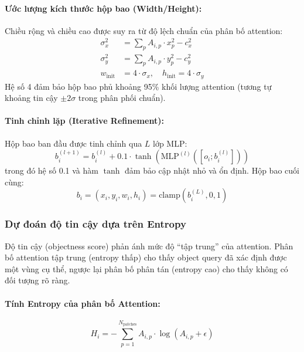 \paragraph{Ước lượng kích thước hộp bao (Width/Height):}
Chiều rộng và chiều cao được suy ra từ độ lệch chuẩn của phân bố attention:
\begin{align}
    \sigma_x^2 &= \sum_{p} A_{i,p} \cdot x_p^2 - c_x^2 \\
    \sigma_y^2 &= \sum_{p} A_{i,p} \cdot y_p^2 - c_y^2 \\
    w_{\text{init}} &= 4 \cdot \sigma_x, \quad h_{\text{init}} = 4 \cdot \sigma_y
\end{align}
Hệ số 4 đảm bảo hộp bao phủ khoảng 95\% khối lượng attention (tương tự khoảng tin cậy \(\pm 2\sigma\) trong phân phối chuẩn).

\paragraph{Tinh chỉnh lặp (Iterative Refinement):}
Hộp bao ban đầu được tinh chỉnh qua \(L\) lớp MLP:
\begin{equation}
    b_i^{(l+1)} = b_i^{(l)} + 0.1 \cdot \tanh\left(\text{MLP}^{(l)}([o_i; b_i^{(l)}])\right)
\end{equation}
trong đó hệ số 0.1 và hàm \(\tanh\) đảm bảo cập nhật nhỏ và ổn định. Hộp bao cuối cùng:
\begin{equation}
    b_i = (x_i, y_i, w_i, h_i) = \text{clamp}(b_i^{(L)}, 0, 1)
\end{equation}

\subsubsection{Dự đoán độ tin cậy dựa trên Entropy}

Độ tin cậy (objectness score) phản ánh mức độ ``tập trung'' của attention. Phân bố attention tập trung (entropy thấp) cho thấy object query đã xác định được một vùng cụ thể, ngược lại phân bố phân tán (entropy cao) cho thấy không có đối tượng rõ ràng.

\paragraph{Tính Entropy của phân bố Attention:}
\begin{equation}
    H_i = -\sum_{p=1}^{N_{\text{patches}}} A_{i,p} \cdot \log(A_{i,p} + \epsilon)
\end{equation}

